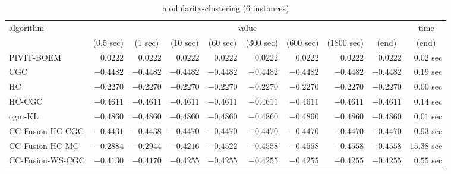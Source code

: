 \begin{table}[H]
\scriptsize
\centering
\caption{modularity-clustering (6 instances)}
\label{tab:anytimetable-modularity-clustering}
\begin{tabular}{lrrrrrrrrr}
\toprule
           algorithm &                                   \multicolumn{8}{c}{value} & \multicolumn{1}{c}{time}   \\  
\cmidrule(lr){2-9}\cmidrule(lr){10-10}   
                     & \multicolumn{1}{c}{(0.5 sec)} & \multicolumn{1}{c}{(1 sec)} & \multicolumn{1}{c}{(10 sec)} & \multicolumn{1}{c}{(60 sec)} & \multicolumn{1}{c}{(300 sec)} & \multicolumn{1}{c}{(600 sec)} & \multicolumn{1}{c}{(1800 sec)} & \multicolumn{1}{c}{(end)} & \multicolumn{1}{c}{(end)}   \\ \midrule 
          PIVIT-BOEM & $       0.0222$ & $       0.0222$ & $       0.0222$ & $       0.0222$ & $       0.0222$ & $       0.0222$ & $       0.0222$ & $       0.0222$ & $         0.02$ sec   \\ 
                 CGC & $      -0.4482$ & $      -0.4482$ & $      -0.4482$ & $      -0.4482$ & $      -0.4482$ & $      -0.4482$ & $      -0.4482$ & $      -0.4482$ & $         0.19$ sec   \\ 
                  HC & $      -0.2270$ & $      -0.2270$ & $      -0.2270$ & $      -0.2270$ & $      -0.2270$ & $      -0.2270$ & $      -0.2270$ & $      -0.2270$ & $         0.00$ sec   \\ 
              HC-CGC & $      -0.4611$ & $      -0.4611$ & $      -0.4611$ & $      -0.4611$ & $      -0.4611$ & $      -0.4611$ & $      -0.4611$ & $      -0.4611$ & $         0.14$ sec   \\ 
              ogm-KL & $      -0.4860$ & $      -0.4860$ & $      -0.4860$ & $      -0.4860$ & $      -0.4860$ & $      -0.4860$ & $      -0.4860$ & $      -0.4860$ & $         0.01$ sec   \\ 
    CC-Fusion-HC-CGC & $      -0.4431$ & $      -0.4438$ & $      -0.4470$ & $      -0.4470$ & $      -0.4470$ & $      -0.4470$ & $      -0.4470$ & $      -0.4470$ & $         0.93$ sec   \\ 
     CC-Fusion-HC-MC & $      -0.2884$ & $      -0.2944$ & $      -0.4216$ & $      -0.4522$ & $      -0.4558$ & $      -0.4558$ & $      -0.4558$ & $      -0.4558$ & $        15.38$ sec   \\ 
    CC-Fusion-WS-CGC & $      -0.4130$ & $      -0.4170$ & $      -0.4255$ & $      -0.4255$ & $      -0.4255$ & $      -0.4255$ & $      -0.4255$ & $      -0.4255$ & $         0.55$ sec   \\ 

\end{tabular}
\end{table}

